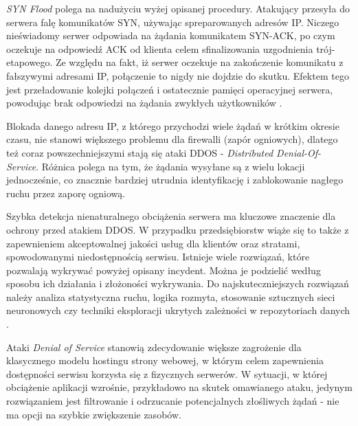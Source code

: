 \documentclass[12pt,twoside]{article}
\begin{document}
\emph{SYN Flood} polega na nadużyciu wyżej opisanej procedury. Atakujący przesyła do serwera falę komunikatów SYN, używając spreparowanych adresów IP. Niczego nieświadomy serwer odpowiada na żądania komunikatem SYN-ACK, po czym oczekuje na odpowiedź ACK od klienta celem sfinalizowania uzgodnienia trój-etapowego. Ze względu na fakt, iż serwer oczekuje na zakończenie komunikatu z fałszywymi adresami IP, połączenie to nigdy nie dojdzie do skutku. Efektem tego jest przeładowanie kolejki połączeń i ostatecznie pamięci operacyjnej serwera, powodując brak odpowiedzi na żądania zwykłych użytkowników \cite{DDosHowItWorks}. 

Blokada danego adresu IP, z którego przychodzi wiele żądań w krótkim okresie czasu, nie stanowi większego problemu dla firewalli (zapór ogniowych), dlatego też coraz powszechniejszymi stają się ataki DDOS - \emph{Distributed Denial-Of-Service}. Różnica polega na tym, że żądania wysyłane są z wielu lokacji jednocześnie, co znacznie bardziej utrudnia identyfikację i zablokowanie nagłego ruchu przez zaporę ogniową.

Szybka detekcja nienaturalnego obciążenia serwera ma kluczowe znaczenie dla ochrony przed atakiem DDOS. W przypadku przedsiębiorstw wiąże się to także z zapewnieniem akceptowalnej jakości usług dla klientów oraz stratami, spowodowanymi niedostępnością serwisu. Istnieje wiele rozwiązań, które pozwalają wykrywać powyżej opisany incydent. Można je podzielić według sposobu ich działania i złożoności wykrywania. Do najskuteczniejszych rozwiązań należy analiza statystyczna ruchu, logika rozmyta, stosowanie sztucznych sieci neuronowych czy techniki eksploracji ukrytych zależności w repozytoriach danych \cite{DDosDetection}. 

Ataki \emph{Denial of Service} stanowią zdecydowanie większe zagrożenie dla klasycznego modelu hostingu strony webowej, w którym celem zapewnienia dostępności serwisu korzysta się z fizycznych serwerów. W sytuacji, w której obciążenie aplikacji wzrośnie, przykładowo na skutek omawianego ataku, jedynym rozwiązaniem jest filtrowanie i odrzucanie potencjalnych złośliwych żądań - nie ma opcji na szybkie zwiększenie zasobów. 
\end{document}
